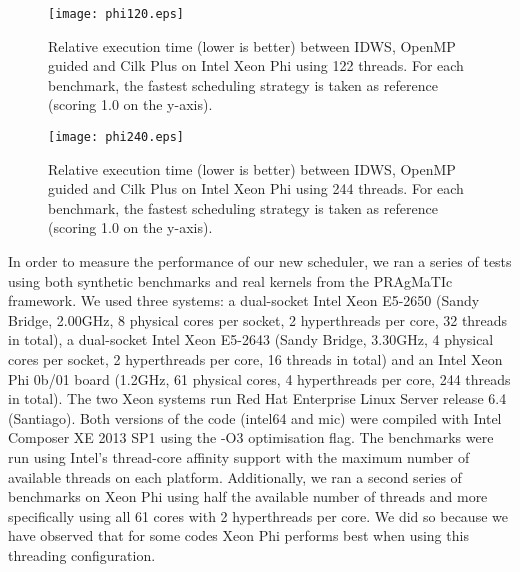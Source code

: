 \documentclass{acm_proc_article-sp}
\newcommand{\PRAGMATIC}{PRAgMaTIc\xspace}
\begin{document}
\begin{figure}[h]
\begin{center}
\texttt{[image: phi120.eps]}
\caption{Relative execution time (lower is better) between IDWS, OpenMP guided
and Cilk Plus on Intel Xeon Phi using 122 threads. For each benchmark, the
fastest scheduling strategy is taken as reference (scoring 1.0 on the y-axis).}
\label{fig:phi_120}
\end{center}
\end{figure}

\begin{figure}[h]
\begin{center}
\texttt{[image: phi240.eps]}
\caption{Relative execution time (lower is better) between IDWS, OpenMP guided
and Cilk Plus on Intel Xeon Phi using 244 threads. For each benchmark, the
fastest scheduling strategy is taken as reference (scoring 1.0 on the y-axis).}
\label{fig:phi_240}
\end{center}
\end{figure}

In order to measure the performance of our new scheduler, we ran a series of
tests using both synthetic benchmarks and real kernels from the \PRAGMATIC
framework. We used three systems: a dual-socket Intel Xeon E5-2650 (Sandy
Bridge, 2.00GHz, 8 physical cores per socket, 2 hyperthreads per core, 32
threads in total), a dual-socket Intel Xeon E5-2643 (Sandy Bridge, 3.30GHz, 4
physical cores per socket, 2 hyperthreads per core, 16 threads in total) and an
Intel Xeon Phi 0b/01 board (1.2GHz, 61 physical cores, 4 hyperthreads per core,
244 threads in total). The two Xeon systems run Red Hat Enterprise Linux Server
release 6.4 (Santiago). Both versions of the code (intel64 and mic) were
compiled with Intel Composer XE 2013 SP1 using the -O3 optimisation flag. The
benchmarks were run using Intel's thread-core affinity support with the maximum
number of available threads on each platform. Additionally, we ran a second
series of benchmarks on Xeon Phi using half the available number of threads and
more specifically using all 61 cores with 2 hyperthreads per core. We did so
because we have observed that for some codes Xeon Phi performs best when using
this threading configuration.
\end{document}
